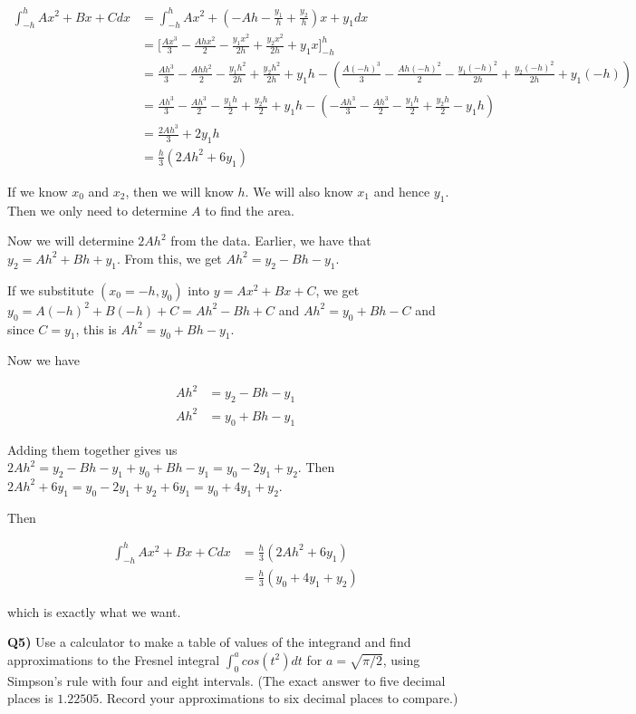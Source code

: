 \documentclass[9pt]{article}
\begin{document}
\begin{align*}
  \int_{-h}^h Ax^2 + Bx + C dx &= \int_{-h}^h Ax^2 + (-Ah - \frac{y_1}{h} + \frac{y_2}{h})x + y_1 dx \\
  &= \bigg[ \frac{Ax^3}{3} - \frac{Ahx^2}{2} - \frac{y_1x^2}{2h} + \frac{y_2x^2}{2h} + y_1x \bigg]_{-h}^h \\
  &= \frac{Ah^3}{3} - \frac{Ahh^2}{2} - \frac{y_1h^2}{2h} + \frac{y_2h^2}{2h} + y_1h - (\frac{A(-h)^3}{3} - \frac{Ah(-h)^2}{2} - \frac{y_1(-h)^2}{2h} + \frac{y_2(-h)^2}{2h} + y_1(-h)) \\
  &= \frac{Ah^3}{3} - \frac{Ah^3}{2} - \frac{y_1h}{2} + \frac{y_2h}{2} + y_1h - (-\frac{Ah^3}{3} - \frac{Ah^3}{2} - \frac{y_1h}{2} + \frac{y_2h}{2} - y_1h) \\
  &= \frac{2Ah^3}{3} + 2y_1h \\
  &= \frac{h}{3}(2Ah^2 + 6y_1)
\end{align*}

If we know $x_0$ and $x_2$, then we will know $h$. We will also know $x_1$ and hence $y_1$. Then we only need to determine $A$ to find the area.

Now we will determine $2Ah^2$ from the data. Earlier, we have that $y_2 = Ah^2 + Bh + y_1$. From this, we get $Ah^2 = y_2 - Bh - y_1$.

If we substitute $(x_0 = -h, y_0)$ into $y = Ax^2 + Bx + C$, we get $y_0 = A(-h)^2 + B(-h) + C = Ah^2 - Bh + C$ and $Ah^2 = y_0 + Bh - C$ and since $C = y_1$, this is $Ah^2 = y_0 + Bh - y_1$.

Now we have

\begin{align*}
  Ah^2 &= y_2 - Bh - y_1 \\
  Ah^2 &= y_0 + Bh - y_1
\end{align*}

Adding them together gives us $2Ah^2 = y_2 - Bh - y_1 + y_0 + Bh - y_1 = y_0 - 2y_1 + y_2$. Then $2Ah^2 + 6y_1 = y_0 - 2y_1 + y_2 + 6y_1 = y_0 + 4y_1 + y_2$.

Then

\begin{align*}
  \int_{-h}^h Ax^2 + Bx + C dx &= \frac{h}{3}(2Ah^2 + 6y_1) \\
  &= \frac{h}{3}(y_0 + 4y_1 + y_2)
\end{align*}

which is exactly what we want.


\begin{tcolorbox}
  \textbf{Q5)} Use a calculator to make a table of values of the integrand and find approximations to the Fresnel integral $\int_0^a cos(t^2) dt$ for $a = \sqrt{\pi / 2}$, using Simpson's rule with four and eight intervals. (The exact answer to five decimal places is $1.22505$. Record your approximations to six decimal places to compare.)
\end{tcolorbox}
\end{document}
